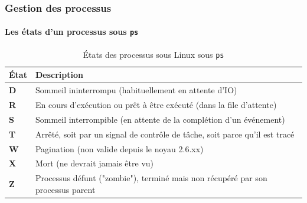 \documentclass{beamer}
\begin{document}
    \begin{frame}
        \transdissolve
        \frametitle{Gestion des processus}
        \framesubtitle{Les états d'un processus sous \lstinline{ps}}
        \begin{table}[h!]
            \centering
            \begin{tabular}{|p{}|p{}|}
                \hline
                \textbf{État} & \textbf{Description}                                                            \\ \hline
                \textbf{D}    & Sommeil ininterrompu (habituellement en attente d'IO)                           \\ \hline
                \textbf{R}    & En cours d'exécution ou prêt à être exécuté (dans la file d'attente)            \\ \hline
                \textbf{S}    & Sommeil interrompible (en attente de la complétion d'un événement)              \\ \hline
                \textbf{T}    & Arrêté, soit par un signal de contrôle de tâche, soit parce qu'il est tracé     \\ \hline
                \textbf{W}    & Pagination (non valide depuis le noyau 2.6.xx)                                  \\ \hline
                \textbf{X}    & Mort (ne devrait jamais être vu)                                                \\ \hline
                \textbf{Z}    & Processus défunt ("zombie"), terminé mais non récupéré par son processus parent \\ \hline
            \end{tabular}
            \caption{États des processus sous Linux sous \lstinline{ps}}
        \end{table}
    \end{frame}
\end{document}
